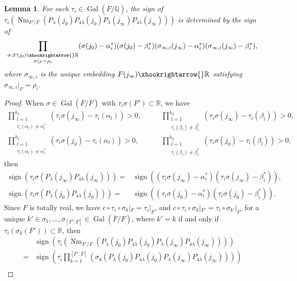 \documentclass{amsart}
\numberwithin{equation}{subsection}
\numberwithin{theorem}{section}
\newtheorem{lemma}[theorem]{Lemma}
\theoremstyle{definition}
\theoremstyle{remark}
\newcommand{\bQ}{\mathbb{Q}}
\newcommand{\bR}{\mathbb{R}}
\DeclareMathOperator{\Nm}{Nm}
\DeclareMathOperator{\Gal}{Gal}
\DeclareMathOperator{\sgn}{sign}
\begin{document}
\begin{lemma}
    For each $\tau_i \in \Gal(\overline{F}/\bQ)$, the sign of $\tau_i(\Nm_{F'/F}(P_{\lambda}(j_0)P_{4\lambda}(j_0)P_{\lambda}(j_\infty)P_{4\lambda}(j_\infty)))$ is determined by the sign of $$\prod_{\substack{\sigma: F(j_0)\xhookrightarrow{}\bR \\ \sigma|_{F} = \rho_i}}(\sigma(j_0) - \alpha_{i}^*)(\sigma(j_0)- \beta_i^*)(\sigma_{\infty,i}(j_\infty) - \alpha_{i}^*)(\sigma_{\infty,i}(j_\infty)- \beta_i^*),$$
    where $\sigma_{\infty,i}$ is the unique embedding $ F(j_{\infty}) \xhookrightarrow{} \bR$ satisfying $\sigma_{\infty,i}|_F = \rho_i$. 
\end{lemma}
\begin{proof}
When $\sigma\in \Gal(\overline{F}/F)$ with $\tau_i\sigma(F')\subset \bR$, we have 
\begin{align*}
   \prod_{\substack{l=1\\\tau_i(\alpha_l)\neq \alpha_i^*}}^{h_1}\left(\tau_i\sigma (j_\infty) - \tau_i(\alpha_l)\right)>0, \quad & \quad \prod_{\substack{l=1\\\tau_i(\beta_l)\neq \beta_i^*}}^{h_2}\left(\tau_i\sigma (j_\infty) - \tau_i(\beta_l)\right)>0,\\
   \prod_{\substack{l=1\\\tau_i(\alpha_l)\neq \alpha_i^*}}^{h_1}\left(\tau_i\sigma (j_0) - \tau_i(\alpha_l)\right)>0, \quad & \quad \prod_{\substack{l=1\\\tau_i(\beta_l)\neq \beta_i^*}}^{h_2}\left(\tau_i\sigma (j_0) - \tau_i(\beta_l)\right)>0,
\end{align*}
then 
\begin{align*}
    \sgn(\tau_i\sigma(P_{\lambda}(j_\infty)P_{4\lambda}(j_\infty))) = &\sgn \left((\tau_i\sigma(j_\infty) - \alpha_{i}^*)(\tau_i\sigma(j_\infty)- \beta_i^*)\right), \\
     \sgn(\tau_i\sigma(P_{\lambda}(j_0)P_{4\lambda}(j_0))) = &\sgn \left((\tau_i\sigma(j_0) - \alpha_{i}^*)(\tau_i\sigma(j_0)- \beta_i^*)\right).
\end{align*}
Since $F$ is totally real, we have $c\circ \tau_i\circ \sigma_k|_F = \tau_i|_F$, and $c\circ \tau_i\circ \sigma_k|_{F'} = \tau_i\circ \sigma_{k'}|_{F'}$ for a unique $k'\in \sigma_1, \dotsc, \sigma_{[F':F]} \in \Gal(\overline{F}/F)$, where $k' = k$ if and only if $\tau_i(\sigma_k(F'))\subset\bR$, then  
\begin{align*}
    &\sgn(\tau_i(\Nm_{F'/F}(P_{\lambda}(j_0)P_{4\lambda}(j_0)P_{\lambda}(j_\infty)P_{4\lambda}(j_\infty)))) \\=&\sgn\left(\tau_i \prod_{k=1}^{[F':F]} (\sigma_k (P_{\lambda}(j_0)P_{4\lambda}(j_0)P_{\lambda}(j_\infty)P_{4\lambda}(j_\infty)))\right) \\

\end{align*}
\end{proof}
\end{document}
